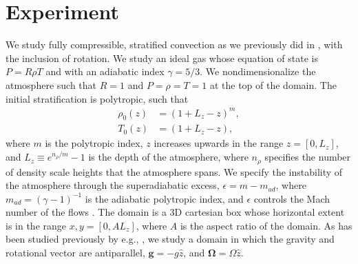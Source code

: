 \documentclass[twocolumn, amsmath, amsfonts, amssymb]{aastex62}
\begin{document}
\section{Experiment} 
\label{sec:experiment}
We study fully compressible, stratified 
convection as we previously did in \cite{anders&brown2017}, with 
the inclusion of rotation. We study an ideal gas whose
equation of state is $P = R \rho T$ and with an adiabatic
index $\gamma = 5/3$. We nondimensionalize the atmosphere such that
$R = 1$ and $P = \rho = T = 1$ at the top of the domain.
The initial stratification is polytropic, such that
\begin{equation}
\begin{split}
\rho_0(z) &= (1 + L_z - z)^m, \\
T_0(z)    &= (1 + L_z - z),
\label{eqn:polytrope}
\end{split}
\end{equation}
where $m$ is the polytropic index,
$z$ increases upwards in the range $z = [0, L_z]$, and
$L_z \equiv e^{n_\rho/m} - 1$ is the depth of the atmosphere,
where $n_\rho$ specifies the number of density scale heights that the
atmosphere spans. We specify the instability of the atmosphere
through the superadiabatic excess, $\epsilon = m - m_{ad}$, where
$m_{ad} = (\gamma-1)^{-1}$ is the adiabatic polytropic index, and
$\epsilon$ controls the Mach number of the flows \citep{anders&brown2017}.
The domain is a 3D cartesian box whose horizontal extent is in the range
$x, y = [0, AL_z]$, where $A$ is the aspect ratio of the domain.
As has been studied previously by e.g., \cite{julien&all1996, brummell&all1996}, 
we study a domain in which the
gravity and rotational vector are antiparallel, $\bm{g} = -g\hat{z}$,
and $\bm{\Omega} = \Omega \hat{z}$.
\end{document}
